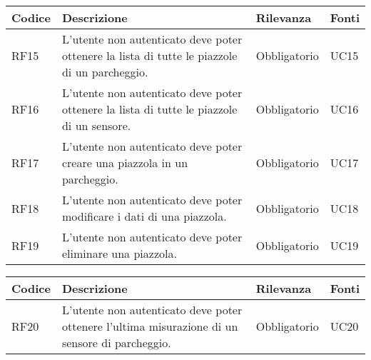 \leavevmode\newline
\begin{table}
    \begin{tabular}{|p{1cm}|p{6cm}|p{1.9cm}|p{1cm}|} 
    \hline
    Codice & Descrizione & Rilevanza &  Fonti \\ 
    \hline
    RF15 & L'utente non autenticato deve poter ottenere la lista di tutte le piazzole di un parcheggio. & Obbligatorio & UC15 \\ 
    \hline
    RF16 & L'utente non autenticato deve poter ottenere la lista di tutte le piazzole di un sensore. & Obbligatorio & UC16 \\ 
    \hline
    RF17 & L'utente non autenticato deve poter creare una piazzola in un parcheggio. & Obbligatorio & UC17 \\ 
    \hline
    RF18 & L'utente non autenticato deve poter modificare i dati di una piazzola. & Obbligatorio & UC18 \\
    \hline
    RF19 & L'utente non autenticato deve poter eliminare una piazzola. & Obbligatorio & UC19 \\
    \hline
    \end{tabular}
\end{table}

\leavevmode\newline
\begin{table}
    \begin{tabular}{|p{1cm}|p{6cm}|p{1.9cm}|p{1cm}|} 
    \hline
    Codice & Descrizione & Rilevanza &  Fonti \\ 
    \hline
    RF20 & L'utente non autenticato deve poter ottenere l'ultima misurazione di un sensore di parcheggio. & Obbligatorio & UC20 \\ 
    \hline
    \end{tabular}
\end{table}


